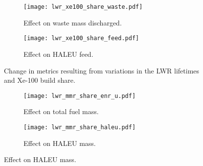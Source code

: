\begin{figure}
    \ContinuedFloat    
    \begin{subfigure}[t]{0.48\textwidth}
        \centering
        \texttt{[image: lwr\_xe100\_share\_waste.pdf]}
        \caption{Effect on waste mass discharged.}
        \label{fig:lwr_xe100_share_waste}
    \end{subfigure}
    \hfill
    \begin{subfigure}[t]{0.48\textwidth}
        \centering
        \texttt{[image: lwr\_xe100\_share\_feed.pdf]}
        \caption{Effect on HALEU feed.}
        \label{fig:lwr_xe100_share_feed}
    \end{subfigure}
    \caption{Change in metrics resulting from variations in the 
    LWR lifetimes and Xe-100 build share.}
    \label{fig:lwr_xe100_share}
\end{figure}

\begin{figure}
    \begin{subfigure}[t]{0.48\textwidth}
        \centering
        \texttt{[image: lwr\_mmr\_share\_enr\_u.pdf]}
        \caption{Effect on total fuel mass.}
        \label{fig:lwr_mmr_share_enr_u}
    \end{subfigure}
    \hfill
    \begin{subfigure}[t]{0.48\textwidth}
        \centering
        \texttt{[image: lwr\_mmr\_share\_haleu.pdf]}
        \caption{Effect on HALEU mass.}
        \label{fig:lwr_mmr_share_haleu}
    \end{subfigure}
\end{figure}


